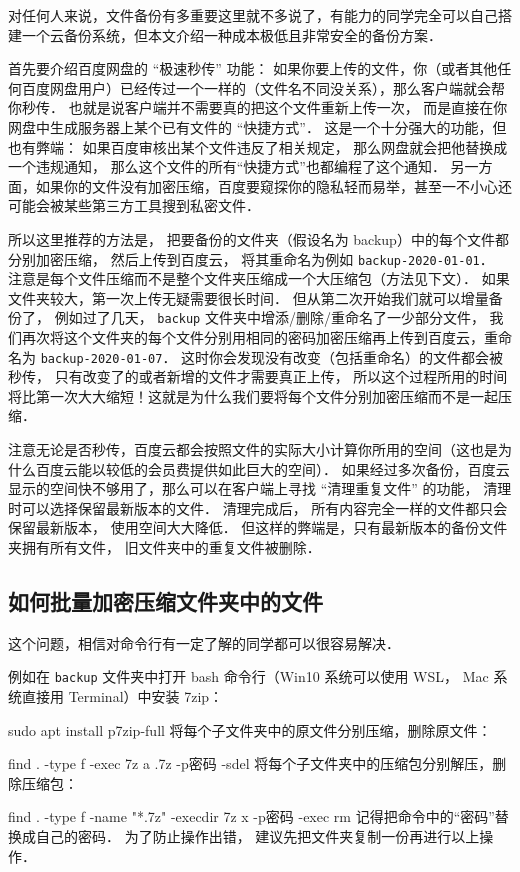 
对任何人来说，文件备份有多重要这里就不多说了，有能力的同学完全可以自己搭建一个云备份系统，但本文介绍一种成本极低且非常安全的备份方案．

首先要介绍百度网盘的 “极速秒传” 功能： 如果你要上传的文件，你（或者其他任何百度网盘用户）已经传过一个一样的（文件名不同没关系），那么客户端就会帮你秒传． 也就是说客户端并不需要真的把这个文件重新上传一次， 而是直接在你网盘中生成服务器上某个已有文件的 “快捷方式”． 这是一个十分强大的功能，但也有弊端： 如果百度审核出某个文件违反了相关规定， 那么网盘就会把他替换成一个违规通知， 那么这个文件的所有“快捷方式”也都编程了这个通知． 另一方面，如果你的文件没有加密压缩，百度要窥探你的隐私轻而易举，甚至一不小心还可能会被某些第三方工具搜到私密文件．

所以这里推荐的方法是， 把要备份的文件夹（假设名为 backup）中的每个文件都分别加密压缩， 然后上传到百度云， 将其重命名为例如 \verb|backup-2020-01-01|． 注意是每个文件压缩而不是整个文件夹压缩成一个大压缩包（方法见下文）． 如果文件夹较大，第一次上传无疑需要很长时间． 但从第二次开始我们就可以增量备份了， 例如过了几天， \verb|backup| 文件夹中增添/删除/重命名了一少部分文件， 我们再次将这个文件夹的每个文件分别用相同的密码加密压缩再上传到百度云，重命名为 \verb|backup-2020-01-07|． 这时你会发现没有改变（包括重命名）的文件都会被秒传， 只有改变了的或者新增的文件才需要真正上传， 所以这个过程所用的时间将比第一次大大缩短！这就是为什么我们要将每个文件分别加密压缩而不是一起压缩．

注意无论是否秒传，百度云都会按照文件的实际大小计算你所用的空间（这也是为什么百度云能以较低的会员费提供如此巨大的空间）． 如果经过多次备份，百度云显示的空间快不够用了，那么可以在客户端上寻找 “清理重复文件” 的功能， 清理时可以选择保留最新版本的文件． 清理完成后， 所有内容完全一样的文件都只会保留最新版本， 使用空间大大降低． 但这样的弊端是，只有最新版本的备份文件夹拥有所有文件， 旧文件夹中的重复文件被删除．

\subsection{如何批量加密压缩文件夹中的文件}

这个问题，相信对命令行有一定了解的同学都可以很容易解决．

例如在 \verb|backup| 文件夹中打开 bash 命令行（Win10 系统可以使用 WSL， Mac 系统直接用 Terminal）中安装 7zip：

sudo apt install p7zip-full
将每个子文件夹中的原文件分别压缩，删除原文件：

find . -type f -exec 7z a {}.7z -p密码 -sdel {} \;
将每个子文件夹中的压缩包分别解压，删除压缩包：

find . -type f -name "*.7z" -execdir 7z x {} -p密码 \; -exec rm {} \;
记得把命令中的“密码”替换成自己的密码． 为了防止操作出错， 建议先把文件夹复制一份再进行以上操作．